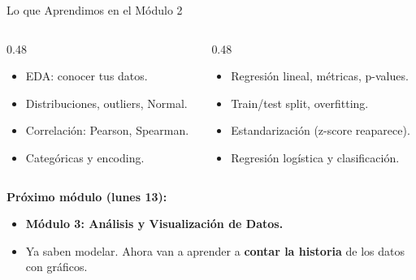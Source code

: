 \documentclass[aspectratio=169, 11pt]{beamer}
\begin{document}
\begin{frame}{Lo que Aprendimos en el Módulo 2}
  \vspace{-4pt}
  \begin{columns}[T]
    \begin{column}{0.48\textwidth}
      {\footnotesize
      \begin{itemize}\setlength{\itemsep}{4pt}
        \item[{\color{codeGreen}\faCheckCircle}]
          EDA: conocer tus datos.
        \item[{\color{codeGreen}\faCheckCircle}]
          Distribuciones, outliers, Normal.
        \item[{\color{codeGreen}\faCheckCircle}]
          Correlación: Pearson, Spearman.
        \item[{\color{codeGreen}\faCheckCircle}]
          Categóricas y encoding.
      \end{itemize}
      }
    \end{column}

    \begin{column}{0.48\textwidth}
      {\footnotesize
      \begin{itemize}\setlength{\itemsep}{4pt}
        \item[{\color{codeGreen}\faCheckCircle}]
          Regresión lineal, métricas, p-values.
        \item[{\color{codeGreen}\faCheckCircle}]
          Train/test split, overfitting.
        \item[{\color{codeGreen}\faCheckCircle}]
          Estandarización (z-score reaparece).
        \item[{\color{codeGreen}\faCheckCircle}]
          Regresión logística y clasificación.
      \end{itemize}
      }
    \end{column}
  \end{columns}

  \vspace{6pt}
  {\small\color{arcaDark}\bfseries Próximo módulo (lunes 13):}
  \vspace{2pt}
  {\footnotesize
  \begin{itemize}\setlength{\itemsep}{2pt}
    \item[{\color{arcaRed}\faArrowRight}]
      \textbf{Módulo 3: Análisis y Visualización de Datos.}
    \item[{\color{arcaRed}\faArrowRight}]
      Ya saben modelar. Ahora van a aprender a \textbf{contar la historia}
      de los datos con gráficos.
  \end{itemize}
  }
\end{frame}
\end{document}
